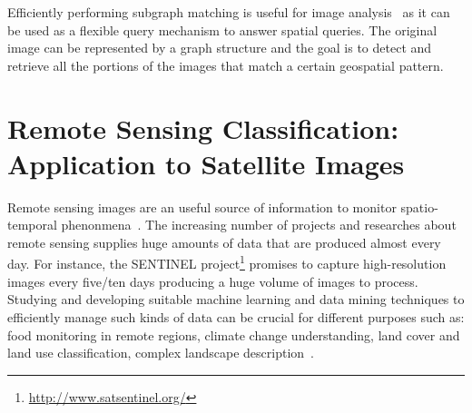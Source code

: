 Efficiently performing subgraph matching is useful for image analysis~\cite{GautamaBTP07} as it can be used as a flexible query mechanism to answer spatial queries. The original image can be represented by a graph structure and the goal is to detect and retrieve all the portions of the images that match a certain geospatial pattern. 

\section{Remote Sensing Classification: Application to Satellite Images}

Remote sensing images are an useful source of information to monitor spatio-temporal phenonmena~\cite{XueSQDW15}.
The increasing number of projects and researches about remote sensing supplies huge amounts of data that are produced almost every day. For instance, the SENTINEL project\footnote{\url{http://www.satsentinel.org/}} promises to capture high-resolution images every five/ten days producing a huge volume of images to process. Studying and developing suitable machine learning and data mining techniques to efficiently manage such kinds of data can be crucial for different purposes such as: food monitoring in remote regions, climate change understanding, land cover and land use classification, complex landscape description~\cite{Mueller-Warrant15,TsangJ10}.


